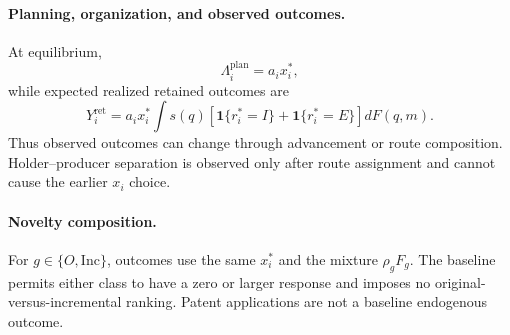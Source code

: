 \documentclass[11pt]{article}
\begin{document}
\paragraph{Planning, organization, and observed outcomes.}
At equilibrium,
\[
  \Lambda_i^{\mathrm{plan}}=a_ix_i^*,
\]
while expected realized retained outcomes are
\begin{equation}
  Y_i^{\mathrm{ret}}
  =
  a_ix_i^*
  \int s(q)
  \left[
  \mathbf 1\{r_i^*=I\}
  +
  \mathbf 1\{r_i^*=E\}
  \right]dF(q,m).
  \label{eq:p16m-retained-outcome}
\end{equation}
Thus observed outcomes can change through advancement or route composition.
Holder--producer separation is observed only after route assignment and
cannot cause the earlier \(x_i\) choice.

\paragraph{Novelty composition.}
For \(g\in\{O,\mathrm{Inc}\}\), outcomes use the same \(x_i^*\) and the
mixture \(\rho_gF_g\). The baseline permits either class to have a zero or
larger response and imposes no original-versus-incremental ranking. Patent
applications are not a baseline endogenous outcome.
\end{document}
